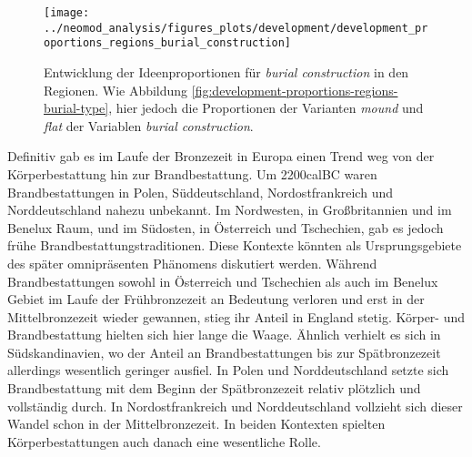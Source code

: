 \documentclass[openany,twoside,twocolumn]{book}
\begin{document}
\begin{figure}[!t]

{\centering \texttt{[image: ../neomod\_analysis/figures\_plots/development/development\_proportions\_regions\_burial\_construction]} 

}

\caption[Entwicklung der Ideenproportionen für \textit{burial construction} in den Regionen]{Entwicklung der Ideenproportionen für \textit{burial construction} in den Regionen. Wie Abbildung \ref{fig:development-proportions-regions-burial-type}, hier jedoch die Proportionen der Varianten \textit{mound} und \textit{flat} der Variablen \textit{burial construction}.}\label{fig:development-proportions-regions-burial-construction}
\end{figure}

Definitiv gab es im Laufe der Bronzezeit in Europa einen Trend weg von der Körperbestattung hin zur Brandbestattung. Um 2200calBC waren Brandbestattungen in Polen, Süddeutschland, Nordostfrankreich und Norddeutschland nahezu unbekannt. Im Nordwesten, in Großbritannien und im Benelux Raum, und im Südosten, in Österreich und Tschechien, gab es jedoch frühe Brandbestattungstraditionen. Diese Kontexte könnten als Ursprungsgebiete des später omnipräsenten Phänomens diskutiert werden. Während Brandbestattungen sowohl in Österreich und Tschechien als auch im Benelux Gebiet im Laufe der Frühbronzezeit an Bedeutung verloren und erst in der Mittelbronzezeit wieder gewannen, stieg ihr Anteil in England stetig. Körper- und Brandbestattung hielten sich hier lange die Waage. Ähnlich verhielt es sich in Südskandinavien, wo der Anteil an Brandbestattungen bis zur Spätbronzezeit allerdings wesentlich geringer ausfiel. In Polen und Norddeutschland setzte sich Brandbestattung mit dem Beginn der Spätbronzezeit relativ plötzlich und vollständig durch. In Nordostfrankreich und Norddeutschland vollzieht sich dieser Wandel schon in der Mittelbronzezeit. In beiden Kontexten spielten Körperbestattungen auch danach eine wesentliche Rolle.
\end{document}
